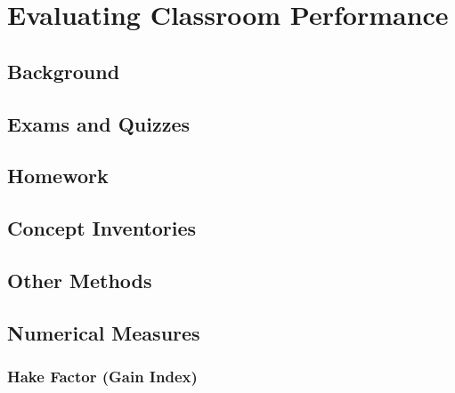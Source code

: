 \chapter[Chapter 4: Evaluating Classroom Performance]{Evaluating Classroom Performance}

\section{Background}

\section{Exams and Quizzes}

\section{Homework}

\section{Concept Inventories}

\section{Other Methods}

\section{Numerical Measures}

\subsection{Hake Factor (Gain Index)}